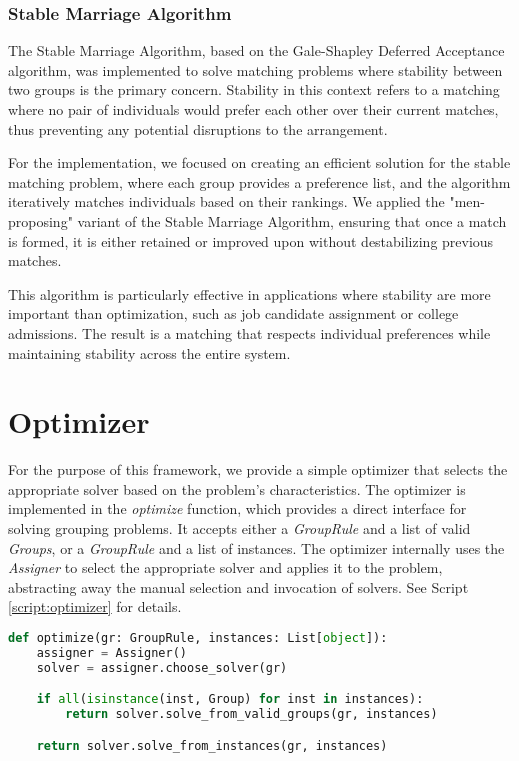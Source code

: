     
    \subsubsection{Stable Marriage Algorithm}
    The Stable Marriage Algorithm, based on the Gale-Shapley Deferred Acceptance algorithm, was implemented to solve matching problems where stability between two groups is the primary concern. Stability in this context refers to a matching where no pair of individuals would prefer each other over their current matches, thus preventing any potential disruptions to the arrangement.
    
    For the implementation, we focused on creating an efficient solution for the stable matching problem, where each group provides a preference list, and the algorithm iteratively matches individuals based on their rankings. We applied the "men-proposing" variant of the Stable Marriage Algorithm, ensuring that once a match is formed, it is either retained or improved upon without destabilizing previous matches.
    
    This algorithm is particularly effective in applications where stability are more important than optimization, such as job candidate assignment or college admissions. The result is a matching that respects individual preferences while maintaining stability across the entire system.

    \section{Optimizer}
    For the purpose of this framework, we provide a simple optimizer that selects the appropriate solver based on the problem's characteristics.
    The optimizer is implemented in the \textit{optimize} function, which provides a direct interface for solving grouping problems.
    It accepts either a \textit{GroupRule} and a list of valid \textit{Groups}, or a \textit{GroupRule} and a list of instances.
    The optimizer internally uses the \textit{Assigner} to select the appropriate solver and applies it to the problem, abstracting away the manual selection and invocation of solvers.
    See Script \ref{script:optimizer} for details.

    \begin{lstlisting}[language=Python, caption={Optimizer.}, label={script:optimizer}]
def optimize(gr: GroupRule, instances: List[object]):
    assigner = Assigner()
    solver = assigner.choose_solver(gr)

    if all(isinstance(inst, Group) for inst in instances):
        return solver.solve_from_valid_groups(gr, instances)

    return solver.solve_from_instances(gr, instances)
\end{lstlisting}

